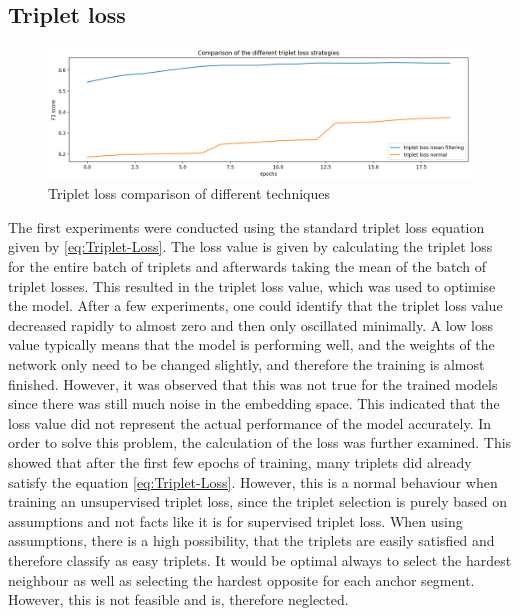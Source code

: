 \subsection{Triplet loss}
\label{sub:Results-Triplet-Loss}
\begin{figure}[htb]
\centering
    \includegraphics[width=0.95\linewidth]{img/Triplet-Loss-Comparison-Techniques.png}
    \caption{Triplet loss comparison of different techniques}
    \label{fig:Triplet-Loss-Techniques}
\end{figure}
\noindent
The first experiments were conducted using the standard triplet loss equation given by \ref{eq:Triplet-Loss}. The loss value is given by calculating the triplet loss for the entire batch of triplets and afterwards taking the mean of the batch of triplet losses. This resulted in the triplet loss value, which was used to optimise the model. After a few experiments, one could identify that the triplet loss value decreased rapidly to almost zero and then only oscillated minimally. A low loss value typically means that the model is performing well, and the weights of the network only need to be changed slightly, and therefore the training is almost finished. However, it was observed that this was not true for the trained models since there was still much noise in the embedding space. This indicated that the loss value did not represent the actual performance of the model accurately.
\newline
\newline
In order to solve this problem, the calculation of the loss was further examined. This showed that after the first few epochs of training, many triplets did already satisfy the equation \ref{eq:Triplet-Loss}. However, this is a normal behaviour when training an unsupervised triplet loss, since the triplet selection is purely based on assumptions and not facts like it is for supervised triplet loss. When using assumptions, there is a high possibility, that the triplets are easily satisfied and therefore classify as easy triplets. It would be optimal always to select the hardest neighbour as well as selecting the hardest opposite for each anchor segment. However, this is not feasible and is, therefore neglected.
